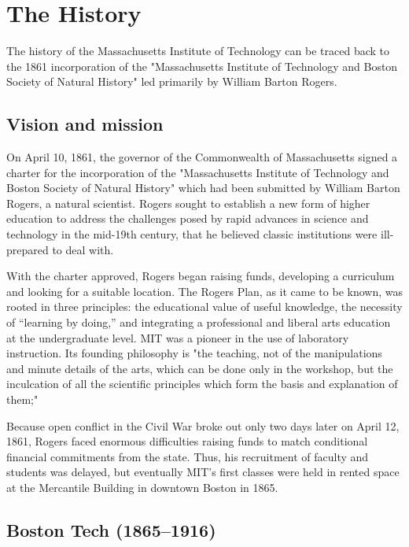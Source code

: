 \section{The History}

The history of the Massachusetts Institute of Technology can be traced back to the 1861 incorporation of the "Massachusetts Institute of Technology and Boston Society of Natural History" led primarily by William Barton Rogers.

\subsection{Vision and mission}

On April 10, 1861, the governor of the Commonwealth of Massachusetts signed a charter for the incorporation of the "Massachusetts Institute of Technology and Boston Society of Natural History" which had been submitted by William Barton Rogers, a natural scientist. Rogers sought to establish a new form of higher education to address the challenges posed by rapid advances in science and technology in the mid-19th century, that he believed classic institutions were ill-prepared to deal with.

With the charter approved, Rogers began raising funds, developing a curriculum and looking for a suitable location. The Rogers Plan, as it came to be known, was rooted in three principles: the educational value of useful knowledge, the necessity of “learning by doing,” and integrating a professional and liberal arts education at the undergraduate level. MIT was a pioneer in the use of laboratory instruction. Its founding philosophy is "the teaching, not of the manipulations and minute details of the arts, which can be done only in the workshop, but the inculcation of all the scientific principles which form the basis and explanation of them;"

Because open conflict in the Civil War broke out only two days later on April 12, 1861, Rogers faced enormous difficulties raising funds to match conditional financial commitments from the state. Thus, his recruitment of faculty and students was delayed, but eventually MIT's first classes were held in rented space at the Mercantile Building in downtown Boston in 1865.

\subsection{Boston Tech (1865–1916)}

